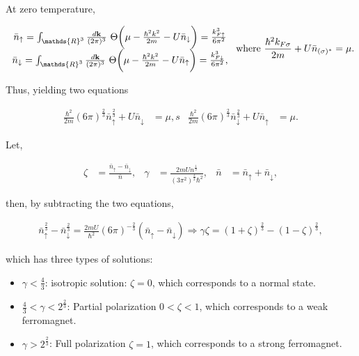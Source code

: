 \documentclass{homework}
\begin{document}

At zero temperature, 

\begin{align}
\begin{array}{c}
    {\bar n}_\uparrow = \int_{\mathds{R}^3} \frac{d {\bf k}}{(2\pi)^3} \blanky \Theta\bigg( \mu - \frac{\hbar^2 k^2}{2m} - U \bar{n}_\downarrow\bigg) = \frac{k_{F\uparrow}^3}{6\pi^2} \\
    {\bar n}_\downarrow = \int_{\mathds{R}^3} \frac{d {\bf k}}{(2\pi)^3} \blanky \Theta\bigg( \mu - \frac{\hbar^2 k^2}{2m} - U \bar{n}_\uparrow\bigg) = \frac{k_{F\downarrow}^3}{6\pi^2},
\end{array}
\textnormal{ where } \frac{\hbar^2 k_{F \sigma}}{2m} + U \bar{n}_{(\sigma)^{*}} = \mu.
\end{align}

Thus, yielding two equations 

\begin{align}
    \frac{\hbar^2}{2m} (6\pi)^{\frac{2}{3}} {\bar n}_{\uparrow}^{\frac{2}{3}} + U {\bar n}_{\downarrow} &= \mu,s & \frac{\hbar^2}{2m} (6\pi)^{\frac{2}{3}} {\bar n}_{\downarrow}^{\frac{2}{3}} + U {\bar n}_{\uparrow} &= \mu.
\end{align}

Let, 

\begin{align*}
    \zeta &= \frac{{\bar n}_{\uparrow}-{\bar n}_{\downarrow}}{{\bar n}}, & \gamma &= \frac{2m U n^{\frac{1}{3}}}{(3\pi^2)^{\frac{3}{2}} \hbar^2}, & {\bar n} &= {\bar n}_{\uparrow} + {\bar n}_{\downarrow},
\end{align*}

then, by subtracting the two equations,

\begin{align}
    {\bar n}_{\uparrow}^{\frac{2}{3}} - {\bar n}_{\downarrow}^{\frac{2}{3}} = \frac{2mU}{\hbar^2} (6\pi)^{-\frac{2}{3}} ({\bar n}_{\uparrow}-{\bar n}_{\downarrow}) \Rightarrow \gamma \zeta = (1+\zeta)^{\frac{2}{3}} - (1-\zeta)^{\frac{2}{3}},
\end{align}

which has three types of solutions:

\begin{itemize}
    \item $\gamma < \frac{4}{3}$: isotropic solution: $\zeta = 0$, which corresponds to a normal state.
    \item $\frac{4}{3} < \gamma < 2^{\frac{2}{3}}$: Partial polarization $0 < \zeta < 1$, which corresponds to a weak ferromagnet.
    \item $\gamma > 2^{\frac{2}{3}}$: Full polarization $\zeta = 1$, which corresponds to a strong ferromagnet. \\
\end{itemize}
\end{document}
